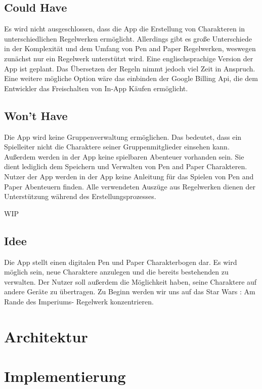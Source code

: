 \subsection{Could Have}
Es wird nicht ausgeschlossen, dass die App die Erstellung von Charakteren in unterschiedlichen Regelwerken ermöglicht. Allerdings gibt es große Unterschiede in der Komplexität und dem Umfang von Pen and Paper Regelwerken, weswegen zunächst nur ein Regelwerk unterstützt wird. Eine englischsprachige Version der App ist geplant. Das Übersetzen der Regeln nimmt jedoch viel Zeit in Anspruch. Eine weitere mögliche Option wäre das einbinden der Google Billing Api, die dem Entwickler das Freischalten von In-App Käufen ermöglicht.

\subsection{Won't Have}
Die App wird keine Gruppenverwaltung ermöglichen. Das bedeutet, dass ein Spielleiter nicht die Charaktere seiner Gruppenmitglieder einsehen kann. Außerdem werden in der App keine spielbaren Abenteuer vorhanden sein. Sie dient lediglich dem Speichern und Verwalten von Pen and Paper Charakteren. Nutzer der App werden in der App keine Anleitung für das Spielen von Pen and Paper Abenteuern finden. Alle verwendeten Auszüge aus Regelwerken dienen der Unterstützung während des Erstellungsprozesses. 

\newpage
WIP
\subsection{Idee}

Die App stellt einen digitalen Pen und Paper Charakterbogen dar. Es wird möglich sein, neue Charaktere anzulegen und die bereits bestehenden zu verwalten. Der Nutzer soll außerdem die Möglichkeit haben, seine Charaktere auf andere Geräte zu übertragen. Zu Beginn werden wir uns auf das \glqq Star Wars : Am Rande des Imperiums\grqq- Regelwerk konzentrieren.

\section{Architektur}

\newpage
\section{Implementierung}


